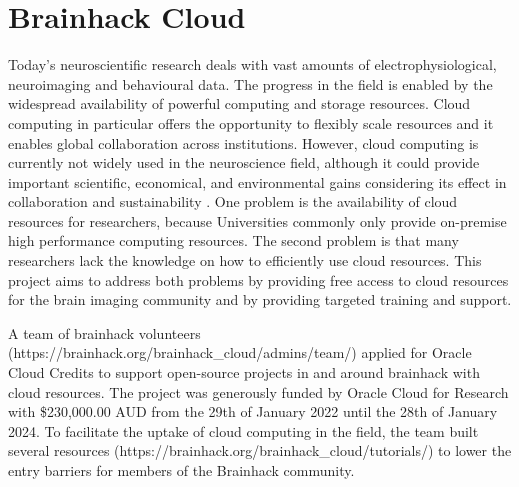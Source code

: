 \documentclass[../main.tex]{subfiles}
\begin{document}
\section{Brainhack Cloud}



Today’s neuroscientific research deals with vast amounts of electrophysiological, neuroimaging and behavioural data. The progress in the field is enabled by the widespread availability of powerful computing and storage resources. Cloud computing in particular offers the opportunity to flexibly scale resources and it enables global collaboration across institutions. However, cloud computing is currently not widely used in the neuroscience field, although it could provide important scientific, economical, and environmental gains considering its effect in collaboration and sustainability \parencite{apon2015, cloudsus}. One problem is the availability of cloud resources for researchers, because Universities commonly only provide on-premise high performance computing resources. The second problem is that many researchers lack the knowledge on how to efficiently use cloud resources. This project aims to address both problems by providing free access to cloud resources for the brain imaging community and by providing targeted training and support.

A team of brainhack volunteers (https://brainhack.org/brainhack_cloud/admins/team/) applied for Oracle Cloud Credits to support open-source projects in and around brainhack with cloud resources. The project was generously funded by Oracle Cloud for Research \parencite{oracleresearch} with \$230,000.00 AUD from the 29th of January 2022 until the 28th of January 2024. To facilitate the uptake of cloud computing in the field, the team built several resources (https://brainhack.org/brainhack_cloud/tutorials/) to lower the entry barriers for members of the Brainhack community. 
\end{document}
